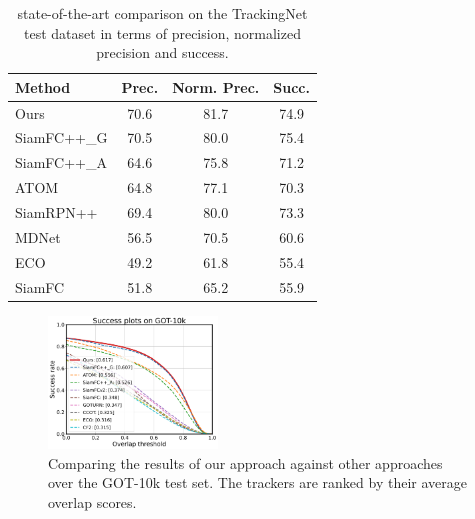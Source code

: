 \begin{table}[t]
\renewcommand\arraystretch{0.8}
\centering
\caption{state-of-the-art comparison on the TrackingNet test dataset in terms of precision, normalized precision and success.}
\vspace{-0.2cm}
\begin{tabular}{l c c c}
\toprule
Method   &  Prec.   &  Norm. Prec. & Succ.  \\
\midrule
Ours  &  70.6&  81.7 &74.9 \\
SiamFC++\_G& 70.5 & 80.0 & 75.4 \\
SiamFC++\_A  & 64.6 & 75.8 & 71.2 \\
ATOM              & 64.8 & 77.1 & 70.3 \\
SiamRPN++&  69.4 & 80.0 &73.3 \\
MDNet	 &  56.5&  70.5 &60.6 \\
ECO	 &  49.2&  61.8 &55.4 \\
SiamFC	 &  51.8&  65.2 &55.9 \\
\bottomrule
\end{tabular}
\label{tabel:trackingnet}
\end{table}
\vspace{-0.2cm}

\begin{figure}[t]
    \centering
    \includegraphics[width=0.4\textwidth]{Img/MTP/got10k/success_plot.png}
    \vspace{-0.3cm}
    \caption{Comparing the results of our approach against other approaches over the GOT-10k test set. The trackers are ranked by their average overlap scores.}
    \label{fig:got10k}
    \vspace{-5mm}
\end{figure}

